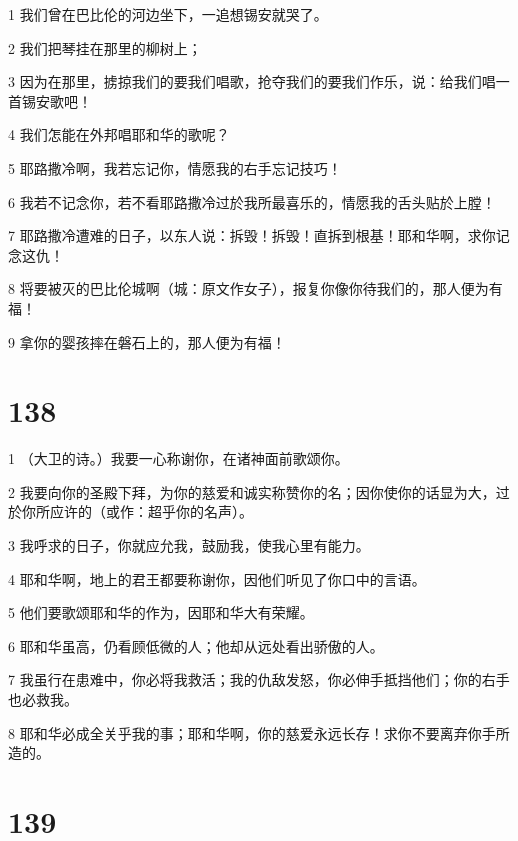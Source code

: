 \par 1 我们曾在巴比伦的河边坐下，一追想锡安就哭了。
\par 2 我们把琴挂在那里的柳树上；
\par 3 因为在那里，掳掠我们的要我们唱歌，抢夺我们的要我们作乐，说：给我们唱一首锡安歌吧！
\par 4 我们怎能在外邦唱耶和华的歌呢？
\par 5 耶路撒冷啊，我若忘记你，情愿我的右手忘记技巧！
\par 6 我若不记念你，若不看耶路撒冷过於我所最喜乐的，情愿我的舌头贴於上膛！
\par 7 耶路撒冷遭难的日子，以东人说：拆毁！拆毁！直拆到根基！耶和华啊，求你记念这仇！
\par 8 将要被灭的巴比伦城啊（城：原文作女子），报复你像你待我们的，那人便为有福！
\par 9 拿你的婴孩摔在磐石上的，那人便为有福！

\chapter{138}

\par 1 （大卫的诗。）我要一心称谢你，在诸神面前歌颂你。
\par 2 我要向你的圣殿下拜，为你的慈爱和诚实称赞你的名；因你使你的话显为大，过於你所应许的（或作：超乎你的名声）。
\par 3 我呼求的日子，你就应允我，鼓励我，使我心里有能力。
\par 4 耶和华啊，地上的君王都要称谢你，因他们听见了你口中的言语。
\par 5 他们要歌颂耶和华的作为，因耶和华大有荣耀。
\par 6 耶和华虽高，仍看顾低微的人；他却从远处看出骄傲的人。
\par 7 我虽行在患难中，你必将我救活；我的仇敌发怒，你必伸手抵挡他们；你的右手也必救我。
\par 8 耶和华必成全关乎我的事；耶和华啊，你的慈爱永远长存！求你不要离弃你手所造的。

\chapter{139}

